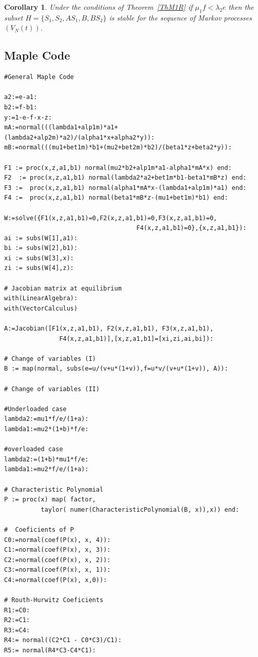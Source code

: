 \documentclass[english]{amsart}
\newtheorem{corollary}[proposition]{Corollary}
\numberwithin{proposition}{section}
\begin{document}
\begin{corollary}
Under the conditions of Theorem~\ref{ThM1R} if $\mu_1f{<}\lambda_2 e$ then  the subset $H{=}\{  { S}_1, { S}_2,  { AS_1},{ B},  { BS_2}\}$ is stable for the sequence of Markov processes $(V_N(t))$. 
\end{corollary}
\subsection{Maple Code}\label{MapCod}

\begin{verbatim}
#General Maple Code

a2:=e-a1:
b2:=f-b1:
y:=1-e-f-x-z:
mA:=normal(((lambda1+alp1m)*a1+(lambda2+alp2m)*a2)/(alpha1*x+alpha2*y)):
mB:=normal(((mu1+bet1m)*b1+(mu2+bet2m)*b2)/(beta1*z+beta2*y)):

F1 := proc(x,z,a1,b1) normal(mu2*b2+alp1m*a1-alpha1*mA*x) end:
F2  := proc(x,z,a1,b1) normal(lambda2*a2+bet1m*b1-beta1*mB*z) end:
F3 :=  proc(x,z,a1,b1) normal(alpha1*mA*x-(lambda1+alp1m)*a1) end:
F4 :=  proc(x,z,a1,b1) normal(beta1*mB*z-(mu1+bet1m)*b1) end:

W:=solve({F1(x,z,a1,b1)=0,F2(x,z,a1,b1)=0,F3(x,z,a1,b1)=0,
                                    F4(x,z,a1,b1)=0},{x,z,a1,b1}):
ai := subs(W[1],a1): 
bi := subs(W[2],b1): 
xi := subs(W[3],x): 
zi := subs(W[4],z): 

# Jacobian matrix at equilibrium
with(LinearAlgebra):
with(VectorCalculus)

A:=Jacobian([F1(x,z,a1,b1), F2(x,z,a1,b1), F3(x,z,a1,b1),
               F4(x,z,a1,b1)],[x,z,a1,b1]=[xi,zi,ai,bi]):

# Change of variables (I)
B := map(normal, subs(e=u/(v+u*(1+v)),f=u*v/(v+u*(1+v)), A)):

# Change of variables (II)

#Underloaded case
lambda2:=mu1*f/e/(1+a):
lambda1:=mu2*(1+b)*f/e:

#overloaded case 
lambda2:=(1+b)*mu1*f/e:
lambda1:=mu2*f/e/(1+a):

# Characteristic Polynomial 
P := proc(x) map( factor,
          taylor( numer(CharacteristicPolynomial(B, x)),x)) end:

#  Coeficients of P
C0:=normal(coef(P(x), x, 4)):
C1:=normal(coef(P(x), x, 3)):
C2:=normal(coef(P(x), x, 2)):
C3:=normal(coef(P(x), x, 1)):
C4:=normal(coef(P(x), x,0)):

# Routh-Hurwitz Coeficients
R1:=C0:
R2:=C1:
R3:=C4:
R4:= normal((C2*C1 - C0*C3)/C1):
R5:= normal(R4*C3-C4*C1):
\end{verbatim}
\end{document}
